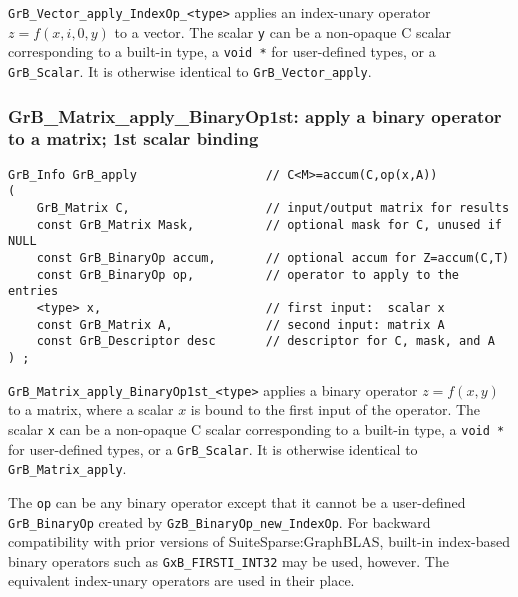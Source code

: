 \documentclass[12pt]{article}
\begin{document}
\verb'GrB_Vector_apply_IndexOp_<type>'  applies an index-unary operator
$z=f(x,i,0,y)$ to a vector.
The scalar \verb'y' can be a non-opaque C scalar corresponding to a built-in
type, a \verb'void *' for user-defined types, or a \verb'GrB_Scalar'.
It is otherwise identical to \verb'GrB_Vector_apply'.

\subsubsection{{\sf GrB\_Matrix\_apply\_BinaryOp1st:} apply a binary operator to a matrix; 1st scalar binding}
\label{matrix_apply1st}

\begin{mdframed}[userdefinedwidth=6in]
{\footnotesize
\begin{verbatim}
GrB_Info GrB_apply                  // C<M>=accum(C,op(x,A))
(
    GrB_Matrix C,                   // input/output matrix for results
    const GrB_Matrix Mask,          // optional mask for C, unused if NULL
    const GrB_BinaryOp accum,       // optional accum for Z=accum(C,T)
    const GrB_BinaryOp op,          // operator to apply to the entries
    <type> x,                       // first input:  scalar x
    const GrB_Matrix A,             // second input: matrix A
    const GrB_Descriptor desc       // descriptor for C, mask, and A
) ;
\end{verbatim} } \end{mdframed}

\verb'GrB_Matrix_apply_BinaryOp1st_<type>'  applies a binary operator
$z=f(x,y)$ to a matrix, where a scalar $x$ is bound to the first input of the
operator.
The scalar \verb'x' can be a non-opaque C scalar corresponding to a built-in
type, a \verb'void *' for user-defined types, or a \verb'GrB_Scalar'.
It is otherwise identical to \verb'GrB_Matrix_apply'.

The \verb'op' can be any binary operator except that it cannot be a
user-defined \verb'GrB_BinaryOp' created by \verb'GzB_BinaryOp_new_IndexOp'.
For backward compatibility with prior versions of SuiteSparse:GraphBLAS,
built-in index-based binary operators such as \verb'GxB_FIRSTI_INT32' may be
used, however.  The equivalent index-unary operators are used in their place.

\end{document}
